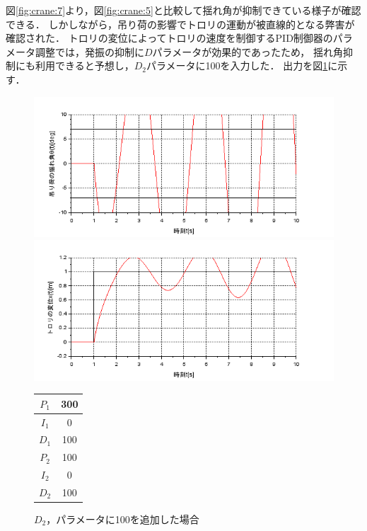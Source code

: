 \documentclass[dvipdfmx,titlepage,a4j]{jsarticle}  %
\begin{document}
図\ref{fig:crane:7}より，図\ref{fig:crane:5}と比較して揺れ角が抑制できている様子が確認できる．
しかしながら，吊り荷の影響でトロリの運動が被直線的となる弊害が確認された．
トロリの変位によってトロリの速度を制御するPID制御器のパラメータ調整では，発振の抑制に$D$パラメータが効果的であったため，
揺れ角抑制にも利用できると予想し，$D_2$パラメータに100を入力した．
出力を図\ref{fig:crane:8}に示す．

\begin{figure}[H]
  \begin{minipage}{4.5cm}
    \centering
    \includegraphics[keepaspectratio, scale=0.35]{../graph/crane/po-P1-300-I1-0-D1-100-P2-100-I2-0-D2-100.png}
  \end{minipage}
  \hfill
  \begin{minipage}{4.5cm}
    \centering
    \includegraphics[keepaspectratio, scale=0.35]{../graph/crane/ang-P1-300-I1-0-D1-100-P2-100-I2-0-D2-100.png}
  \end{minipage}
  \hfill
  \begin{minipage}{3cm}
    \begin{center}
      \begin{tabular}{c|c}
        \hline
        $P_1$ & 300 \\ \hline
        $I_1$ & 0   \\ \hline
        $D_1$ & 100 \\ \hline
        $P_2$ & 100 \\ \hline
        $I_2$ & 0   \\ \hline
        $D_2$ & 100 \\
        \hline
      \end{tabular}
    \end{center}
  \end{minipage}
  \hfill
  \caption{$D_2$，パラメータに100を追加した場合}
  \label{fig:crane:8}
\end{figure}
\end{document}
